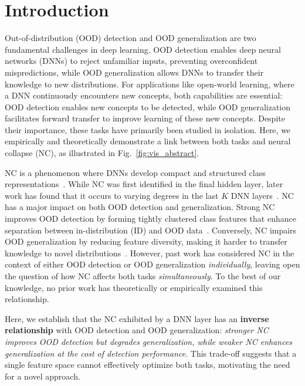 \section{Introduction}
\label{sec:intro}



Out-of-distribution (OOD) detection and OOD generalization are two fundamental challenges in deep learning. OOD detection enables deep neural networks (DNNs) to reject unfamiliar inputs, preventing overconfident mispredictions, while OOD generalization allows DNNs to transfer their knowledge to new distributions. For applications like open-world learning, where a DNN continuously encounters new concepts, both capabilities are essential: OOD detection enables new concepts to be detected, while OOD generalization facilitates forward transfer to improve learning of these new concepts. Despite their importance, these tasks have primarily been studied in isolation. Here, we empirically and theoretically demonstrate a link between both tasks and neural collapse (NC), as illustrated in Fig.~\ref{fig:vis_abstract}.


NC is a phenomenon where DNNs develop compact and structured class representations~\cite{papyan2020prevalence}. While NC was first identified in the final hidden layer, later work has found that it occurs to varying degrees in the last $K$ DNN layers~\cite{rangamani2023feature,harun2024what,sukenikneural2024}. NC has a major impact on both OOD detection and generalization. Strong NC improves OOD detection by forming tightly clustered class features that enhance separation between in-distribution (ID) and OOD data~\cite{haas2023linking, wu2024pursuing, ming2022poem}. Conversely, NC impairs OOD generalization by reducing feature diversity, making it harder to transfer knowledge to novel distributions~\cite{kothapalli2023neural, masarczyk2023tunnel,harun2024what}. However, past work has considered NC in the context of either OOD detection or OOD generalization \textit{individually}, leaving open the question of how NC affects both tasks \textit{simultaneously}. To the best of our knowledge, no prior work has theoretically or empirically examined this relationship.

Here, we establish that the NC exhibited by a DNN layer has an \textbf{inverse relationship} with OOD detection and OOD generalization: \textit{stronger NC improves OOD detection but degrades generalization, while weaker NC enhances generalization at the cost of detection performance}. This trade-off suggests that a single feature space cannot effectively optimize both tasks, motivating the need for a novel approach. %

